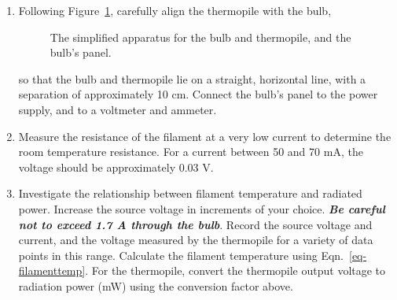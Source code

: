 \documentclass{article}
\begin{document}
\begin{enumerate}


\item Following Figure~\ref{fig:apparatus}, carefully align the thermopile with the bulb, 
\begin{figure}
\begin{centering}

\caption{The simplified apparatus for the bulb and thermopile, and the bulb's panel.}
\label{fig:apparatus}
\end{centering}
\end{figure}
so that the bulb and thermopile lie on a straight, horizontal line, with a separation of approximately 10 cm.  Connect the bulb's panel to the power supply, and to a voltmeter and ammeter.   

\item Measure the resistance of the filament at a very low current to determine the room temperature resistance.  For a current between 50 and 70 mA, the voltage should be approximately 0.03 V.  

\item \label{sec:PvsT} Investigate the relationship between filament temperature and radiated power. Increase the source voltage in increments of your choice.  {\bf \em Be careful not to exceed 1.7 A through the bulb}.  Record the source voltage and current, and the voltage measured by the thermopile for a variety of data points in this range.  Calculate the filament temperature using Eqn.~\ref{eq-filamenttemp}.   For the thermopile, convert the thermopile output voltage to radiation power (mW) using the conversion factor above. 


\end{enumerate}
\end{document}
